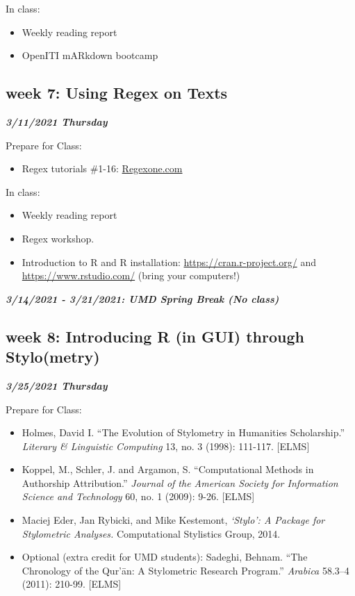\documentclass[
]{book}
\providecommand{\tightlist}{%
  \setlength{\itemsep}{0pt}\setlength{\parskip}{0pt}}
\begin{document}
In class:

\begin{itemize}
\tightlist
\item
  Weekly reading report
\item
  OpenITI mARkdown bootcamp
\end{itemize}

\hypertarget{week-7-using-regex-on-texts}{%
\subsection{week 7: Using Regex on Texts}\label{week-7-using-regex-on-texts}}

\textbf{\emph{3/11/2021 Thursday}}

Prepare for Class:

\begin{itemize}
\tightlist
\item
  Regex tutorials \#1-16: \url{Regexone.com}
\end{itemize}

In class:

\begin{itemize}
\tightlist
\item
  Weekly reading report
\item
  Regex workshop.
\item
  Introduction to R and R installation: \url{https://cran.r-project.org/} and \url{https://www.rstudio.com/} (bring your computers!)
\end{itemize}

\textbf{\emph{3/14/2021 - 3/21/2021: UMD Spring Break (No class)}}

\hypertarget{week-8-introducing-r-in-gui-through-stylometry}{%
\subsection{week 8: Introducing R (in GUI) through Stylo(metry)}\label{week-8-introducing-r-in-gui-through-stylometry}}

\textbf{\emph{3/25/2021 Thursday}}

Prepare for Class:

\begin{itemize}
\tightlist
\item
  Holmes, David I. ``The Evolution of Stylometry in Humanities Scholarship.'' \emph{Literary \& Linguistic Computing} 13, no. 3 (1998): 111-117. {[}ELMS{]}
\item
  Koppel, M., Schler, J. and Argamon, S. ``Computational Methods in Authorship Attribution.'' \emph{Journal of the American Society for Information Science and Technology} 60, no. 1 (2009): 9-26. {[}ELMS{]}
\item
  Maciej Eder, Jan Rybicki, and Mike Kestemont, \emph{`Stylo': A Package for Stylometric Analyses.} Computational Stylistics Group, 2014.
\item
  Optional (extra credit for UMD students): Sadeghi, Behnam. ``The Chronology of the Qur'ān: A Stylometric Research Program.'' \emph{Arabica} 58.3--4 (2011): 210-99. {[}ELMS{]}
\end{itemize}
\end{document}
